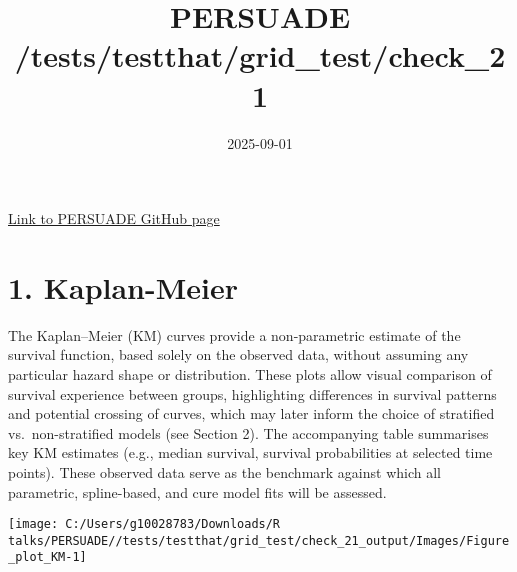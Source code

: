 \documentclass[
]{article}
\title{PERSUADE /tests/testthat/grid\_test/check\_21}
\author{}
\date{\vspace{-2.5em}2025-09-01}
\begin{document}
\maketitle

{
\hypersetup{linkcolor=}
\setcounter{tocdepth}{2}
\tableofcontents
}
\hfill\break

\href{https://github.com/Bram-R/PERSUADE}{Link to PERSUADE GitHub page}

\clearpage

\section{1. Kaplan-Meier}\label{kaplan-meier}

The Kaplan--Meier (KM) curves provide a non-parametric estimate of the
survival function, based solely on the observed data, without assuming
any particular hazard shape or distribution. These plots allow visual
comparison of survival experience between groups, highlighting
differences in survival patterns and potential crossing of curves, which
may later inform the choice of stratified vs.~non-stratified models (see
Section 2). The accompanying table summarises key KM estimates (e.g.,
median survival, survival probabilities at selected time points). These
observed data serve as the benchmark against which all parametric,
spline-based, and cure model fits will be assessed.

\clearpage

\begin{flushleft}\texttt{[image: C:/Users/g10028783/Downloads/R talks/PERSUADE//tests/testthat/grid\_test/check\_21\_output/Images/Figure\_plot\_KM-1]} \end{flushleft}

\begin{table}[H]
\centering
\caption{\label{tab:Table_1}Observed survival data}
\centering
{}
\end{table}
\end{document}
